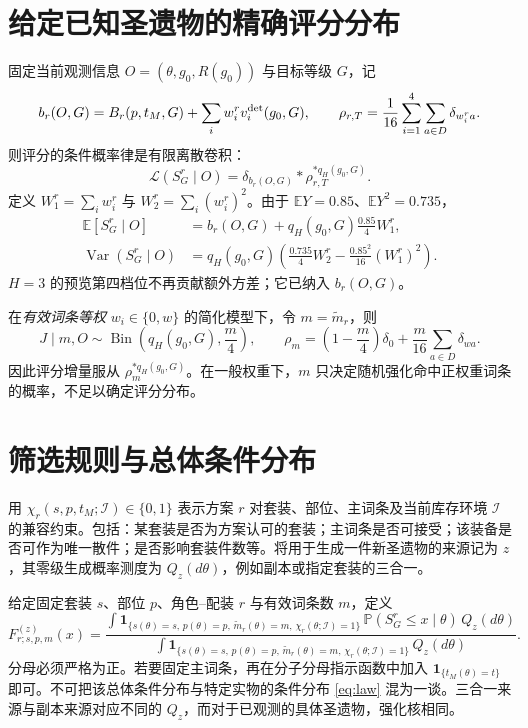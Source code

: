 \documentclass[11pt,a4paper]{ctexart}
\newcommand{\Ind}{\mathbf 1}
\newcommand{\Law}{\mathcal L}
\newcommand{\Var}{\operatorname{Var}}
\newcommand{\E}{\mathbb E}
\newcommand{\Prob}{\mathbb P}
\newcommand{\Bin}{\operatorname{Bin}}
\begin{document}
\section{给定已知圣遗物的精确评分分布}
固定当前观测信息 $O=(\theta,g_0,R(g_0))$ 与目标等级 $G$，记
\[
b_r(O,G)=B_r(p,t_M,G)+\sum_iw_i^r v_i^{\rm det}(g_0,G),\qquad
\rho_{r,T}=\frac1{16}\sum_{i=1}^4\sum_{a\in D}\delta_{w_i^r a}.
\]
则评分的条件概率律是有限离散卷积：
\begin{equation}\label{eq:law}
\boxed{\Law(S_G^r\mid O)=\delta_{b_r(O,G)}*\rho_{r,T}^{*q_H(g_0,G)}.}
\end{equation}
定义 $W_1^r=\sum_iw_i^r$ 与 $W_2^r=\sum_i(w_i^r)^2$。由于 $\E Y=0.85$、$\E Y^2=0.735$，
\begin{align}
\E[S_G^r\mid O]&=b_r(O,G)+q_H(g_0,G)\frac{0.85}{4}W_1^r,\\
\Var(S_G^r\mid O)&=q_H(g_0,G)\left(\frac{0.735}{4}W_2^r-\frac{0.85^2}{16}(W_1^r)^2\right).
\end{align}
$H=3$ 的预览第四档位不再贡献额外方差；它已纳入 $b_r(O,G)$。

在\emph{有效词条等权} $w_i\in\{0,w\}$ 的简化模型下，令 $m=\widetilde m_r$，则
\[
J\mid m,O\sim\Bin\left(q_H(g_0,G),\frac m4\right),\qquad
\rho_m=\left(1-\frac m4\right)\delta_0+\frac m{16}\sum_{a\in D}\delta_{wa}.
\]
因此评分增量服从 $\rho_m^{*q_H(g_0,G)}$。在一般权重下，$m$ 只决定随机强化命中正权重词条的概率，不足以确定评分分布。

\section{筛选规则与总体条件分布}
用 $\chi_r(s,p,t_M;\mathcal I)\in\{0,1\}$ 表示方案 $r$ 对套装、部位、主词条及当前库存环境 $\mathcal I$ 的兼容约束。包括：某套装是否为方案认可的套装；主词条是否可接受；该装备是否可作为唯一散件；是否影响套装件数等。将用于生成一件新圣遗物的来源记为 $z$，其零级生成概率测度为 $Q_z(d\theta)$，例如副本或指定套装的三合一。

给定固定套装 $s$、部位 $p$、角色--配装 $r$ 与有效词条数 $m$，定义
\begin{equation}\label{eq:population}
F^{(z)}_{r;s,p,m}(x)=
\frac{\displaystyle\int \Ind_{\{s(\theta)=s,\,p(\theta)=p,\,\widetilde m_r(\theta)=m,\,\chi_r(\theta;\mathcal I)=1\}}\,\Prob(S_G^r\le x\mid\theta)\,Q_z(d\theta)}
{\displaystyle\int \Ind_{\{s(\theta)=s,\,p(\theta)=p,\,\widetilde m_r(\theta)=m,\,\chi_r(\theta;\mathcal I)=1\}}\,Q_z(d\theta)}.
\end{equation}
分母必须严格为正。若要固定主词条，再在分子分母指示函数中加入 $\Ind_{\{t_M(\theta)=t\}}$ 即可。不可把该总体条件分布与特定实物的条件分布 \eqref{eq:law} 混为一谈。三合一来源与副本来源对应不同的 $Q_z$，而对于已观测的具体圣遗物，强化核相同。
\end{document}
